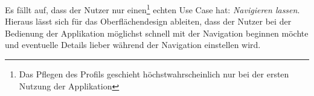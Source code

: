 \noindent Es fällt auf, dass der Nutzer nur einen\footnote{Das Pflegen des Profils geschieht höchstwahrscheinlich nur bei der ersten Nutzung der Applikation} echten Use Case hat: \emph{Navigieren lassen}. Hieraus lässt sich für das Oberflächendesign ableiten, dass der Nutzer bei der Bedienung der Applikation möglichst schnell mit der Navigation beginnen möchte und eventuelle Details lieber während der Navigation einstellen wird. 

